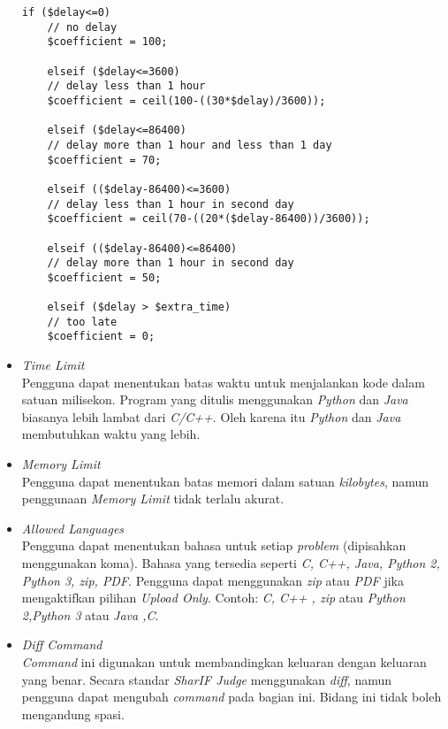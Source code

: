 \begin{itemize}
	\begin{lstlisting}[basicstyle=\ttfamily, frame=single,
	columns=fullflexible, keepspaces=true, breaklines=true, label=ls:7]
	if ($delay<=0)
	// no delay
	$coefficient = 100;
	
	elseif ($delay<=3600)
	// delay less than 1 hour
	$coefficient = ceil(100-((30*$delay)/3600));
	
	elseif ($delay<=86400)
	// delay more than 1 hour and less than 1 day
	$coefficient = 70;
	
	elseif (($delay-86400)<=3600)
	// delay less than 1 hour in second day
	$coefficient = ceil(70-((20*($delay-86400))/3600));
	
	elseif (($delay-86400)<=86400)
	// delay more than 1 hour in second day
	$coefficient = 50;
	
	elseif ($delay > $extra_time)
	// too late
	$coefficient = 0;
	\end{lstlisting}
	
	\item \textit{Time Limit} \\
	Pengguna dapat menentukan batas waktu untuk menjalankan kode dalam satuan milisekon. Program yang ditulis menggunakan \textit{Python} dan \textit{Java} biasanya lebih lambat dari \textit{C/C++}. Oleh karena itu \textit{Python} dan \textit{Java} membutuhkan waktu yang lebih.
	
	\item \textit{Memory Limit} \\
	Pengguna dapat menentukan batas memori dalam satuan \textit{kilobytes}, namun penggunaan \textit{Memory Limit} tidak terlalu akurat.
	
	\item \textit{Allowed Languages} \\
	Pengguna dapat menentukan bahasa untuk setiap \textit{problem} (dipisahkan menggunakan koma). Bahasa yang tersedia seperti \textit{C, C++, Java, Python 2, Python 3, zip, PDF}. Pengguna dapat menggunakan \textit{zip} atau \textit{PDF} jika mengaktifkan pilihan \textit{Upload Only}. Contoh: \textit{C, C++ , zip} atau \textit{Python 2,Python 3} atau \textit{Java ,C}.
	
	\item \textit{Diff Command} \\
	\textit{Command} ini digunakan untuk membandingkan keluaran dengan keluaran yang benar. Secara standar \textit{SharIF Judge} menggunakan \textit{diff}, namun pengguna dapat mengubah \textit{command} pada bagian ini. Bidang ini tidak boleh mengandung spasi.
	

\end{itemize}
